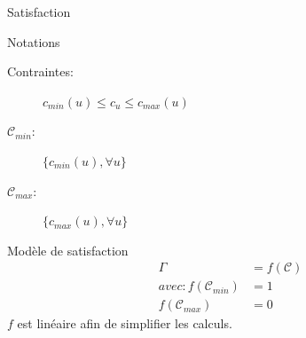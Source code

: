 \begin{frame}{Satisfaction}

\begin{block}{Notations}
  \begin{description}
    \item[Contraintes:] $c_{min}(u) \leq c_u \leq c_{max}(u)$
    \item[$\mathcal{C}_{min}$:] $\{c_{min}(u),  \forall u\}$
    \item[$\mathcal{C}_{max}$:] $\{c_{max}(u),  \forall u\}$
  \end{description}  
\end{block}


  \begin{block}{Modèle de satisfaction}
    \begin{align*}
      \Gamma &= f(\mathcal{C})\\
      avec: f(\mathcal{C}_{min}) &= 1\\
      f(\mathcal{C}_{max}) &= 0
    \end{align*}
    $f$ est linéaire afin de simplifier les calculs.    
  \end{block}



\end{frame}

